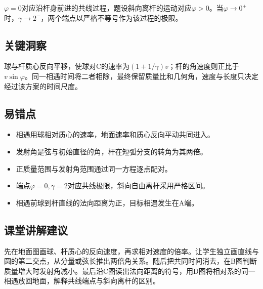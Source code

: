 \documentclass[UTF8,fontset=fandol,a4paper,11pt]{ctexart}
\begin{document}
$\varphi=0$对应沿杆身前进的共线过程，题设斜向离杆的运动对应$\varphi>0$。当$\varphi\to0^+$时，$\gamma\to2^-$，两个端点以严格不等号作为该过程的极限。




\subsection*{关键洞察}

球与杆质心反向平移，使球对C的速率为$(1+1/\gamma)v$；杆的角速度则正比于$v\sin\varphi$。同一相遇时间将二者相除，最终保留质量比和几何角，速度与长度只决定经过该方案的时间尺度。



\subsection*{易错点}

\begin{itemize}
\item 相遇用球相对质心的速率，地面速率和质心反向平动共同进入。
\item 发射角是弦与初始直径的角，杆在短弧分支的转角为其两倍。
\item 正质量范围与发射角范围通过同一方程逐点配对。
\item 端点$\varphi=0,\gamma=2$对应共线极限，斜向自由离杆采用严格区间。
\item 相遇前球到杆直线的法向距离为正，目标相遇发生在A端。\end{itemize}



\subsection*{课堂讲解建议}

先在地面图画球、杆质心的反向速度，再求相对速度的倍率。让学生独立画直线与圆的第二交点，从分量或弦长推出两倍角关系。随后把共同时间消去，在B图判断质量增大时发射角减小。最后沿C图读出法向距离的符号，用D图将相对系的同一相遇放回地面，解释共线端点与斜向离杆的区别。


\end{document}
